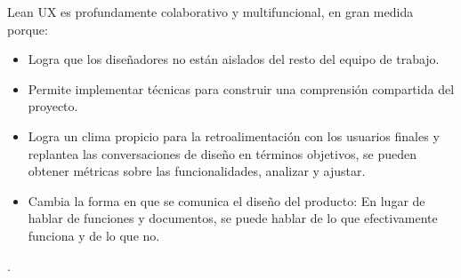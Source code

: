 Lean UX es profundamente colaborativo y multifuncional, en gran medida porque:
\begin{itemize}

    \item Logra que los diseñadores no están aislados del resto del equipo de trabajo.
    \item Permite implementar técnicas para construir una comprensión compartida del proyecto. 
    \item Logra un clima propicio para la retroalimentación con los usuarios finales y  replantea las conversaciones de diseño en términos objetivos, se pueden obtener métricas sobre las funcionalidades, analizar y ajustar.
    \item Cambia la forma en que se comunica el diseño del producto: En lugar de hablar de funciones y documentos, se puede hablar de lo que efectivamente funciona y de lo que no.

\end{itemize}

 \citep{Gothelf2013}. 

\vspace{5mm}


